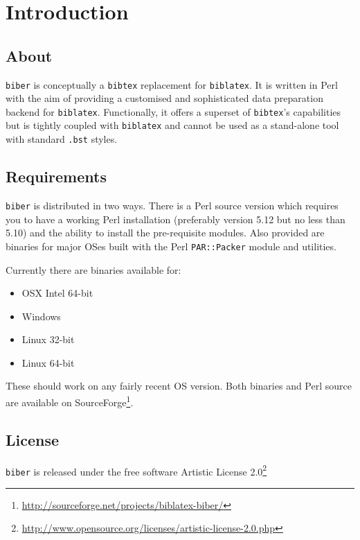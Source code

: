 \documentclass{ltxdockit}
\begin{document}
\printtitlepage
\tableofcontents

\section{Introduction}
\label{int}

\subsection{About}

\verb+biber+ is conceptually a \verb+bibtex+ replacement for
\verb+biblatex+. It is written in Perl with the aim of providing a
customised and sophisticated data preparation backend for \verb+biblatex+.
Functionally, it offers a superset of \verb+bibtex+'s capabilities but is
tightly coupled with \verb+biblatex+ and cannot be used as a stand-alone tool
with standard \verb+.bst+ styles.

\subsection{Requirements}\label{ref:req}

\verb+biber+ is distributed in two ways. There is a Perl source
version which requires you to have a working Perl installation
(preferably version 5.12 but no less than 5.10) and the ability to
install the pre-requisite modules. Also provided are binaries for
major OSes built with the Perl \verb+PAR::Packer+ module and utilities.

Currently there are binaries available for:

\begin{itemize}
\item OSX Intel 64-bit
\item Windows
\item Linux 32-bit
\item Linux 64-bit
\end{itemize}

These should work on any fairly recent OS version. Both binaries and
Perl source are available on SourceForge\footnote{\url{http://sourceforge.net/projects/biblatex-biber/}}.

\subsection{License}

\verb+biber+ is released under the free software Artistic License 2.0\footnote{\url{http://www.opensource.org/licenses/artistic-license-2.0.php}}
\end{document}

